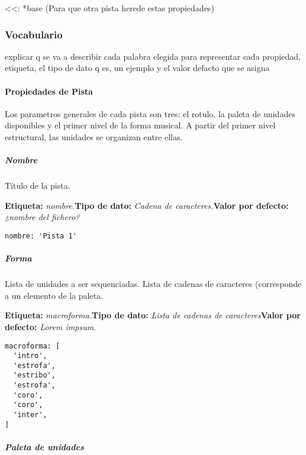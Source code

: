 \documentclass[]{article}
\let\oldparagraph\paragraph
\renewcommand{\paragraph}[1]{\oldparagraph{#1}\mbox{}}
\let\oldsubparagraph\subparagraph
\renewcommand{\subparagraph}[1]{\oldsubparagraph{#1}\mbox{}}
\begin{document}
\textless\textless: *base (Para que otra pista herede estas propiedades)

\hypertarget{vocabulario}{%
\subsubsection{Vocabulario}\label{vocabulario}}

explicar q se va a describir cada palabra elegida para representar cada
propiedad, etiqueta, el tipo de dato q es, un ejemplo y el valor defacto
que se asigna

\hypertarget{propiedades-de-pista}{%
\paragraph{Propiedades de Pista}\label{propiedades-de-pista}}

Los parametros generales de cada pista son tres: el rotulo, la paleta de
unidades disponibles y el primer nivel de la forma musical. A partir del
primer nivel estructural, las unidades se organizan entre ellas.

\hypertarget{nombre}{%
\subparagraph{Nombre}\label{nombre}}

Título de la pista.

\textbf{Etiqueta:} \emph{nombre.}\newline \textbf{Tipo de dato:}
\emph{Cadena de caracteres.}\newline \textbf{Valor por defecto:}
\emph{¿nombre del fichero?}

\begin{verbatim}
nombre: 'Pista 1'
\end{verbatim}

\hypertarget{forma}{%
\subparagraph{Forma}\label{forma}}

Lista de unidades a ser sequenciadas. Lista de cadenas de caracteres
(corresponde a un elemento de la paleta.

\textbf{Etiqueta:} \emph{macroforma.}\newline \textbf{Tipo de dato:}
\emph{Lista de cadenas de caracteres}\newline \textbf{Valor por
defecto:} \emph{Lorem impsum}.\newline

\begin{verbatim}
macroforma: [
  'intro',
  'estrofa',
  'estribo',
  'estrofa',
  'coro',
  'coro',
  'inter',
]
\end{verbatim}

\hypertarget{paleta-de-unidades}{%
\subparagraph{Paleta de unidades}\label{paleta-de-unidades}}
\end{document}
